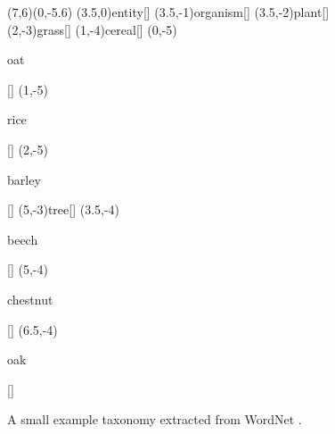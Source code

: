 \begin{figure}
\begin{center}
\begin{graph}(7,6)(0,-5.6)
(3.5,0){entity}[]
(3.5,-1){organism}[]
(3.5,-2){plant}[]
	(2,-3){grass}[]
	(1,-4){cereal}[]
		(0,-5){\rule[-0.5ex]{0pt}{2.1ex}oat}[]
		(1,-5){\rule[-0.5ex]{0pt}{2.1ex}rice}[]
		(2,-5){\rule[-0.5ex]{0pt}{2.1ex}barley}[]
	(5,-3){tree}[]
		(3.5,-4){\rule{0pt}{2ex}beech}[]
		(5,-4){\rule{0pt}{2ex}chestnut}[]
		(6.5,-4){\rule{0pt}{2ex}oak}[]



\end{graph}
\end{center}
\caption{A small example taxonomy extracted from WordNet \citep{Fellbaum:98}.}
\label{plant-taxonomy}
\end{figure}

%


